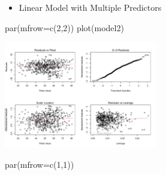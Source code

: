 \documentclass[
  ignorenonframetext,
]{beamer}
\newenvironment{Shaded}{\begin{snugshade}}{\end{snugshade}}
\newcommand{\AttributeTok}[1]{\textcolor[rgb]{0.40,0.45,0.13}{#1}}
\newcommand{\DecValTok}[1]{\textcolor[rgb]{0.68,0.00,0.00}{#1}}
\newcommand{\FunctionTok}[1]{\textcolor[rgb]{0.28,0.35,0.67}{#1}}
\newcommand{\NormalTok}[1]{\textcolor[rgb]{0.00,0.23,0.31}{#1}}
\providecommand{\tightlist}{%
  \setlength{\itemsep}{0pt}\setlength{\parskip}{0pt}}\usepackage{longtable,booktabs,array}
\begin{document}
\begin{frame}[fragile]{}
\label{section-19}
\begin{itemize}
\tightlist
\item
  Linear Model with Multiple Predictors
\end{itemize}

\tiny

\begin{Shaded}
\begin{Highlighting}[]
\FunctionTok{par}\NormalTok{(}\AttributeTok{mfrow=}\FunctionTok{c}\NormalTok{(}\DecValTok{2}\NormalTok{,}\DecValTok{2}\NormalTok{))}
\FunctionTok{plot}\NormalTok{(model2)}
\end{Highlighting}
\end{Shaded}

\begin{center}
\includegraphics[width=0.5\textwidth,height=\textheight]{007_identifying_drivers_of_outcomes_linear_models_files/figure-beamer/unnamed-chunk-17-1.pdf}
\end{center}

\begin{Shaded}
\begin{Highlighting}[]
\FunctionTok{par}\NormalTok{(}\AttributeTok{mfrow=}\FunctionTok{c}\NormalTok{(}\DecValTok{1}\NormalTok{,}\DecValTok{1}\NormalTok{))}
\end{Highlighting}
\end{Shaded}
\end{frame}
\end{document}
